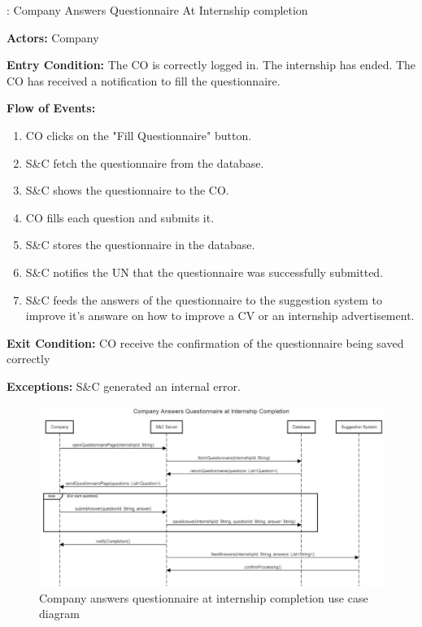 \nextUseCaseID: Company Answers Questionnaire At Internship completion

\par \textbf{Actors:} Company

\par \textbf{Entry Condition:} The CO is correctly logged in. The internship has ended. The CO has received a notification to fill the questionnaire.

\par \textbf{Flow of Events:}

\begin{enumerate}
    \item CO clicks on the "Fill Questionnaire" button.
    \item S\&C fetch the questionnaire from the database.
    \item S\&C shows the questionnaire to the CO.
    \item CO fills each question and submits it.
    \item S\&C stores the questionnaire in the database.
    \item S\&C notifies the UN that the questionnaire was successfully submitted.
    \item S\&C feeds the answers of the questionnaire to the suggestion system to improve it's answare on how to improve a CV or an internship advertisement.
\end{enumerate}

\par \textbf{Exit Condition:} CO receive the confirmation of the questionnaire being saved correctly

\par \textbf{Exceptions:}  S\&C generated an internal error.

\begin{figure}[H]
    \centering
    \includegraphics[width=1.0\textwidth]{Images/UC_14.pdf}
    \caption{Company answers questionnaire at internship completion use case diagram}
    \label{fig:use-case-diagram-14}
\end{figure}

